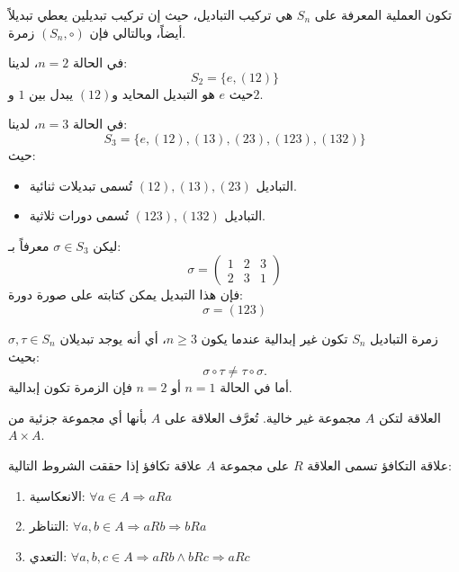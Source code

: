 تكون العملية المعرفة على $S_n$ هي تركيب التباديل، حيث إن تركيب تبديلين يعطي تبديلاً أيضاً، وبالتالي فإن $(S_n, \circ)$ زمرة.

\begin{example}
	في الحالة $n = 2$، لدينا:
	\[
	S_2 = \{ e, (12) \}
	\]
	حيث $e$ هو التبديل المحايد و$(12)$ يبدل بين $1$ و$2$.
\end{example}

\begin{example}
	في الحالة $n = 3$، لدينا:
	\[
	S_3 = \{ e, (12), (13), (23), (123), (132) \}
	\]
	حيث:
	\begin{itemize}
		\item التباديل $(12), (13), (23)$ تُسمى تبديلات ثنائية.
		\item التباديل $(123), (132)$ تُسمى دورات ثلاثية.
	\end{itemize}
\end{example}

\begin{example}
	ليكن $\sigma \in S_3$ معرفاً بـ:
	\[
	\sigma =
	\begin{pmatrix}
		1 & 2 & 3 \\
		2 & 3 & 1
	\end{pmatrix}
	\]
	فإن هذا التبديل يمكن كتابته على صورة دورة:
	\[
	\sigma = (123)
	\]
\end{example}

\begin{note}
	زمرة التباديل $S_n$ تكون غير إبدالية عندما يكون $n \ge 3$، أي أنه يوجد تبديلان $\sigma, \tau \in S_n$ بحيث:
	\[
	\sigma \circ \tau \ne \tau \circ \sigma.
	\]
	أما في الحالة $n = 1$ أو $n = 2$ فإن الزمرة تكون إبدالية.
\end{note}


\begin{definition}{العلاقة}{\cite{ref1}}
	لتكن $A$ مجموعة غير خالية. تُعرَّف العلاقة على $A$ بأنها أي مجموعة جزئية من $A \times A$.
\end{definition}

\begin{definition}{علاقة التكافؤ}{\cite{ref1}}
	تسمى العلاقة $R$ على مجموعة $A$ علاقة تكافؤ إذا حققت الشروط التالية:
	\begin{enumerate}
		\item الانعكاسية: $\forall a \in A \Rightarrow aRa$
		\item التناظر: $\forall a,b \in A \Rightarrow aRb \Rightarrow bRa$
		\item التعدي: $\forall a,b,c \in A \Rightarrow aRb \wedge bRc \Rightarrow aRc$
	\end{enumerate}
\end{definition}

